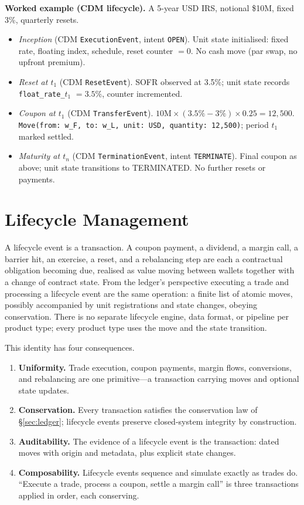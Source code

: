 \documentclass[11pt,a4paper]{article}
\begin{document}
\medskip
\noindent\textbf{Worked example (CDM lifecycle).} A 5-year USD IRS, notional \$10M, fixed 3\%, quarterly resets.

\begin{itemize}[nosep]
\item \emph{Inception} (CDM \texttt{ExecutionEvent}, intent \texttt{OPEN}). Unit state initialised: fixed rate, floating index, schedule, reset counter $=0$. No cash move (par swap, no upfront premium).
\item \emph{Reset at $t_1$} (CDM \texttt{ResetEvent}). SOFR observed at 3.5\%; unit state records \texttt{float\_rate\_$t_1$} $=3.5\%$, counter incremented.
\item \emph{Coupon at $t_1$} (CDM \texttt{TransferEvent}). $10\text{M}\times(3.5\%-3\%)\times0.25 = 12{,}500$. \texttt{Move(from: w\_F, to: w\_L, unit: USD, quantity: 12{,}500)}; period $t_1$ marked settled.
\item \emph{Maturity at $t_n$} (CDM \texttt{TerminationEvent}, intent \texttt{TERMINATE}). Final coupon as above; unit state transitions to TERMINATED. No further resets or payments.
\end{itemize}

\clearpage

\section{Lifecycle Management}
\label{sec:lifecycle}

A lifecycle event is a transaction. A coupon payment, a dividend, a margin call, a barrier hit, an exercise, a reset, and a rebalancing step are each a contractual obligation becoming due, realised as value moving between wallets together with a change of contract state. From the ledger's perspective executing a trade and processing a lifecycle event are the same operation: a finite list of atomic moves, possibly accompanied by unit registrations and state changes, obeying conservation. There is no separate lifecycle engine, data format, or pipeline per product type; every product type uses the move and the state transition.

This identity has four consequences.

\begin{enumerate}[nosep]
\item \textbf{Uniformity.} Trade execution, coupon payments, margin flows, conversions, and rebalancing are one primitive---a transaction carrying moves and optional state updates.
\item \textbf{Conservation.} Every transaction satisfies the conservation law of \S\ref{sec:ledger}; lifecycle events preserve closed-system integrity by construction.
\item \textbf{Auditability.} The evidence of a lifecycle event is the transaction: dated moves with origin and metadata, plus explicit state changes.
\item \textbf{Composability.} Lifecycle events sequence and simulate exactly as trades do. ``Execute a trade, process a coupon, settle a margin call'' is three transactions applied in order, each conserving.
\end{enumerate}
\end{document}
